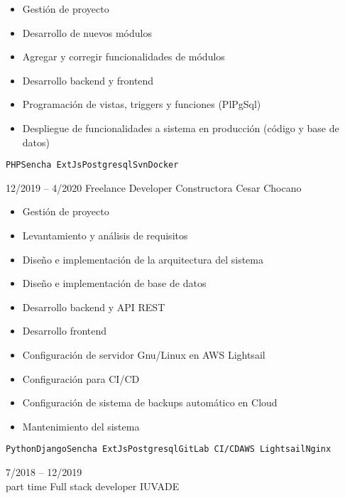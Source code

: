 \begin{entrylist}
{\begin{itemize}
    	        \setlength\parskip{0pt}
    	        \item Gestión de proyecto
    	        \item Desarrollo de nuevos módulos
    	        \item Agregar y corregir funcionalidades de módulos
    	        \item Desarrollo backend y frontend
    	        \item Programación de vistas, triggers y funciones (PlPgSql)
    	        \item Despliegue de funcionalidades a sistema en producción (código y base de datos)
    	    \end{itemize}
		    \texttt{PHP}\slashsep\texttt{Sencha ExtJs}\slashsep\texttt{Postgresql}\slashsep\texttt{Svn}\slashsep\texttt{Docker}
        }
    \entry
		{12/2019 -- 4/2020}
		{Freelance Developer}
		{Constructora Cesar Chocano}
		{
		    \vspace{-5mm}
    	    \begin{itemize}
    	        \setlength\itemsep{0pt}
    	        \setlength\parskip{0pt}
    	        \item Gestión de proyecto
    	        \item Levantamiento y análisis de requisitos
    	        \item Diseño e implementación de la arquitectura del sistema
    	        \item Diseño e implementación de base de datos
    	        \item Desarrollo backend y API REST
    	        \item Desarrollo frontend
    	        \item Configuración de servidor Gnu/Linux en AWS Lightsail
    	        \item Configuración para CI/CD
    	        \item Configuración de sistema de backups automático en Cloud
    	        \item Mantenimiento del sistema
    	    \end{itemize}
		    \texttt{Python}\slashsep\texttt{Django}\slashsep\texttt{Sencha ExtJs}\slashsep\texttt{Postgresql}\slashsep\texttt{GitLab CI/CD}\slashsep\texttt{AWS Lightsail}\slashsep\texttt{Nginx}
        }
	\entry
		{7/2018 -- 12/2019\\\footnotesize{part time}}
		{Full stack developer}
		{IUVADE}
		{
		    \vspace{-5mm}
    	    \begin{itemize}

\end{itemize}}
\end{entrylist}

